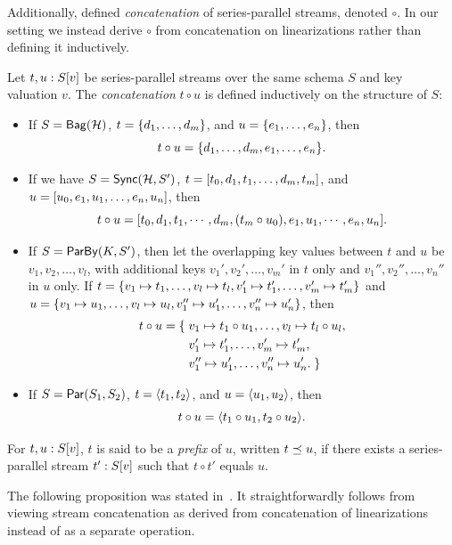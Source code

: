 Additionally,  defined \emph{concatenation} of series-parallel streams, denoted $\circ$.
In our setting we instead derive $\circ$ from concatenation on linearizations rather than defining it inductively.

\begin{definition}
\label{45:def:trace-concat}
Let $t, u: \spstype{v}{S}$ be series-parallel streams over the same schema $S$ and key valuation $v$.
The  \emph{concatenation} $t \circ u$ is defined inductively on the structure of $S$:
\begin{itemize}
\item If $S = \relleaf{\mathcal{H}}$,
$t = \spsbag{d_1, \ldots, d_m}$,
and $u = \spsbag{e_1, \ldots, e_n}$,
then
\[t \circ u = \spsbag{d_1, \ldots, d_m, e_1, \ldots, e_n}.\]
\item If we have $S = \hier{\mathcal{H}}{S'}$,
$t = \spsseq{t_0, d_1, t_1, \ldots, d_m, t_m}$,
and
$u = \spsseq{u_0, e_1, u_1, \ldots, e_n, u_n}$,
then
\[t \circ u =
\spsseq{t_0, d_1, t_1, \cdots, d_m, (t_m \circ u_0), e_1, u_1, \cdots, e_n, u_n}.
\]
\item If $S = \keyby{K}{S'}$,
then let the overlapping key values between $t$ and $u$ be
$v_1, v_2, \ldots, v_l$,
with additional keys $v_1', v_2', \ldots, v_m'$ in $t$ only
and $v_1'', v_2'', \ldots, v_n''$ in $u$ only.
If
$t = \spsbag{\keyed{v_1}{t_1}, \ldots, \keyed{v_l}{t_l},
\keyed{v_1'}{t_1'}, \ldots, \keyed{v_m'}{t_m'}}$
and
$u = \spsbag{\keyed{v_1}{u_1}, \ldots, \keyed{v_l}{u_l},
\keyed{v_1''}{u_1'}, \ldots, \keyed{v_n''}{u_n'}}$,
then
\begin{align*}
t \circ u = \spsbagleft{}
&\keyed{v_1}{t_1 \circ u_1}, \ldots, \keyed{v_l}{t_l \circ u_l}, \\
&\keyed{v_1'}{t_1'}, \ldots, \keyed{v_m'}{t_m'}, \\
&\keyed{v_1''}{u_1'}, \ldots, \keyed{v_n''}{u_n'}.\spsbagright{}
\end{align*}
\item If $S = \parcomp{S_1}{S_2}$,
$t = \spspar{t_1}{t_2}$, and $u = \spspar{u_1}{u_2}$,
then
\[
t \circ u = \spspar{t_1 \circ u_1}{t_2 \circ u_2}.
\]
\end{itemize}
For $t, u: \spstype{v}{S}$, $t$ is said to be a \emph{prefix} of $u$, written $t\prefix u$,
if there exists a series-parallel stream $t' : \spstype{v}{S}$ such that $t\circ t'$
equals $u$.
\end{definition}

The following proposition was stated in~.
It straightforwardly follows from viewing stream concatenation as derived from concatenation of linearizations instead of as a separate operation.

